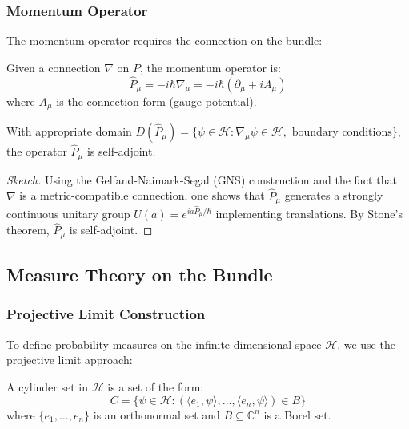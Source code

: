 \subsubsection{Momentum Operator}

The momentum operator requires the connection on the bundle:

\begin{definition}
Given a connection $\nabla$ on $P$, the momentum operator is:
\begin{equation}
    \hat{P}_\mu = -i\hbar \nabla_\mu = -i\hbar \left( \partial_\mu + iA_\mu \right)
\end{equation}
where $A_\mu$ is the connection form (gauge potential).
\end{definition}

\begin{theorem}
With appropriate domain $D(\hat{P}_\mu) = \{\psi \in \mathcal{H} : \nabla_\mu \psi \in \mathcal{H}, \text{ boundary conditions}\}$, the operator $\hat{P}_\mu$ is self-adjoint.
\end{theorem}

\begin{proof}[Sketch]
Using the Gelfand-Naimark-Segal (GNS) construction and the fact that $\nabla$ is a metric-compatible connection, one shows that $\hat{P}_\mu$ generates a strongly continuous unitary group $U(a) = e^{ia\hat{P}_\mu/\hbar}$ implementing translations. By Stone's theorem, $\hat{P}_\mu$ is self-adjoint.
\end{proof}

\subsection{Measure Theory on the Bundle}

\subsubsection{Projective Limit Construction}

To define probability measures on the infinite-dimensional space $\mathcal{H}$, we use the projective limit approach:

\begin{definition}
A cylinder set in $\mathcal{H}$ is a set of the form:
\begin{equation}
    C = \{ \psi \in \mathcal{H} : (\langle e_1, \psi \rangle, \ldots, \langle e_n, \psi \rangle) \in B \}
\end{equation}
where $\{e_1, \ldots, e_n\}$ is an orthonormal set and $B \subseteq \mathbb{C}^n$ is a Borel set.
\end{definition}

